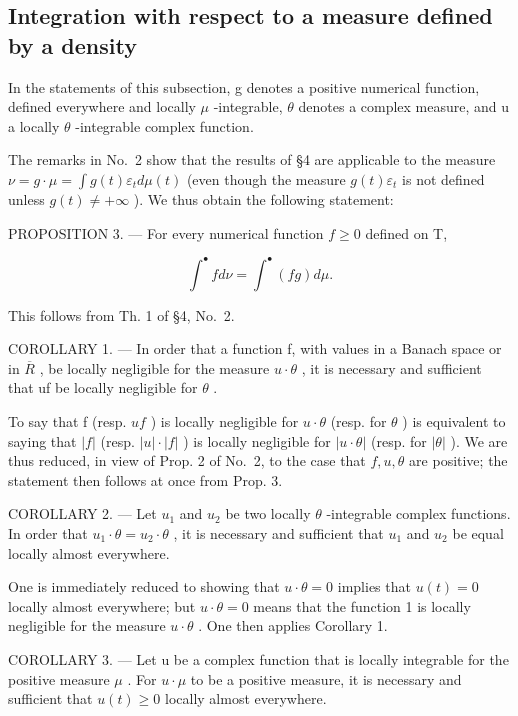 \subsection{Integration with respect to a measure defined by a density}

In the statements of this subsection, g denotes a positive numerical function, defined everywhere and locally \(\mu\) -integrable, \(\theta\) denotes a complex measure, and u a locally \(\theta\) -integrable complex function.

The remarks in No.~2 show that the results of §4 are applicable to the measure \(\nu = g \cdot \mu = \int g(t)\varepsilon_t d\mu(t)\) (even though the measure \(g(t)\varepsilon_t\) is not defined unless \(g(t) \neq +\infty\) ). We thus obtain the following statement:

PROPOSITION 3. --- For every numerical function \(f \geqslant 0\) defined on T,

\[
\int^ {\bullet} f d \nu = \int^ {\bullet} (f g) d \mu .\tag{5}
\]

This follows from Th. 1 of §4, No.~2.

COROLLARY 1. --- In order that a function f, with values in a Banach space or in \(\overline{R}\) , be locally negligible for the measure \(u \cdot \theta\) , it is necessary and sufficient that uf be locally negligible for \(\theta\) .

To say that f (resp. \(uf\) ) is locally negligible for \(u \cdot \theta\) (resp. for \(\theta\) ) is equivalent to saying that \(|f|\) (resp. \(|u| \cdot |f|\) ) is locally negligible for \(|u \cdot \theta|\) (resp. for \(|\theta|\) ). We are thus reduced, in view of Prop. 2 of No.~2, to the case that \(f, u, \theta\) are positive; the statement then follows at once from Prop. 3.

COROLLARY 2. --- Let \(u_1\) and \(u_2\) be two locally \(\theta\) -integrable complex functions. In order that \(u_1 \cdot \theta = u_2 \cdot \theta\) , it is necessary and sufficient that \(u_1\) and \(u_2\) be equal locally almost everywhere.

One is immediately reduced to showing that \(u \cdot \theta = 0\) implies that \(u(t) = 0\) locally almost everywhere; but \(u \cdot \theta = 0\) means that the function 1 is locally negligible for the measure \(u \cdot \theta\) . One then applies Corollary 1.

COROLLARY 3. --- Let u be a complex function that is locally integrable for the positive measure \(\mu\) . For \(u \cdot \mu\) to be a positive measure, it is necessary and sufficient that \(u(t) \geqslant 0\) locally almost everywhere.

